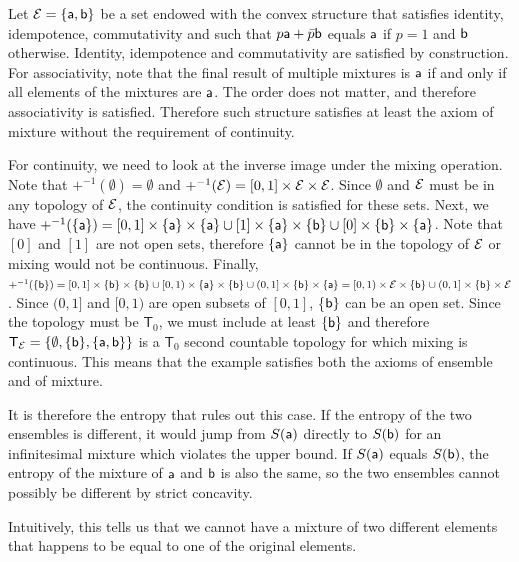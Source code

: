 \begin{example}
	Let $\Ens = \{\ens[a], \ens[b]\}$ be a set endowed with the convex structure that satisfies identity, idempotence, commutativity and such that $p \ens[a] + \bar{p} \ens[b]$ equals $\ens[a]$ if $p=1$ and $\ens[b]$ otherwise. Identity, idempotence and commutativity are satisfied by construction. For associativity, note that the final result of multiple mixtures is $\ens[a]$ if and only if all elements of the mixtures are $\ens[a]$. The order does not matter, and therefore associativity is satisfied. Therefore such structure satisfies at least the axiom of mixture without the requirement of continuity.
	
	For continuity, we need to look at the inverse image under the mixing operation. Note that $+^{-1}(\emptyset) = \emptyset$ and $+^{-1}(\Ens) = [0,1] \times \Ens \times \Ens$. Since $\emptyset$ and $\Ens$ must be in any topology of $\Ens$, the continuity condition is satisfied for these sets. Next, we have  $+^{-1}(\{\ens[a]\}) = [0,1] \times \{\ens[a]\} \times \{\ens[a]\} \cup [1] \times \{\ens[a]\} \times \{\ens[b]\} \cup [0] \times \{\ens[b]\} \times \{\ens[a]\}$. Note that $[0]$ and $[1]$ are not open sets, therefore $\{\ens[a]\}$ cannot be in the topology of $\Ens$ or mixing would not be continuous. Finally, $+^{-1}(\{\ens[b]\}) = [0,1] \times \{\ens[b]\} \times \{\ens[b]\} \cup [0,1) \times \{\ens[a]\} \times \{\ens[b]\} \cup (0,1] \times \{\ens[b]\} \times \{\ens[a]\} = [0,1) \times \Ens \times \{\ens[b]\} \cup (0,1] \times \{\ens[b]\} \times \Ens$. Since $(0,1]$ and $[0,1)$ are open subsets of $[0,1]$, \{$\ens[b]\}$ can be an open set. Since the topology must be $\textsf{T}_0$, we must include at least $\{\ens[b]\}$ and therefore $\mathsf{T}_{\Ens} = \{\emptyset, \{\ens[b]\}, \{\ens[a], \ens[b]\}\}$ is a $\mathsf{T}_0$ second countable topology for which mixing is continuous. This means that the example satisfies both the axioms of ensemble and of mixture.
\end{example}

It is therefore the entropy that rules out this case. If the entropy of the two ensembles is different, it would jump from $S(\ens[a])$ directly to $S(\ens[b])$ for an infinitesimal mixture which violates the upper bound. If $S(\ens[a])$ equals $S(\ens[b])$, the entropy of the mixture of $\ens[a]$ and $\ens[b]$ is also the same, so the two ensembles cannot possibly be different by strict concavity.

Intuitively, this tells us that we cannot have a mixture of two different elements that happens to be equal to one of the original elements.

